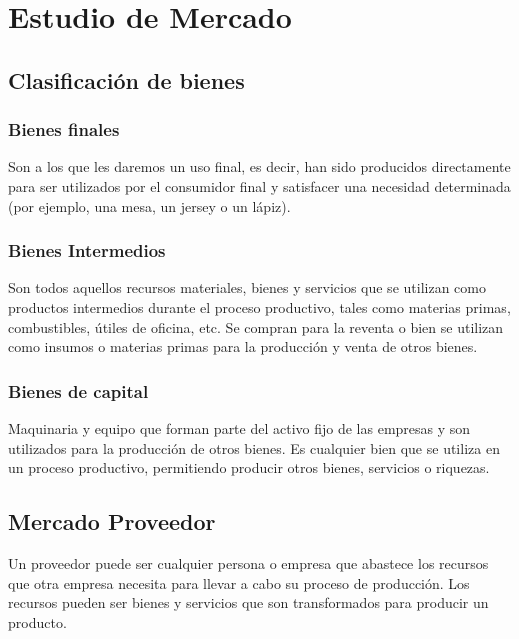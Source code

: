 \documentclass[../main]{subfiles}
\begin{document}
\chapter{Estudio de Mercado}
\section{Clasificación de bienes}
\subsection{Bienes finales}
Son a los que les daremos un uso final, es decir, han sido producidos
directamente para ser utilizados por el consumidor final y satisfacer
una necesidad determinada (por ejemplo, una mesa, un jersey o un lápiz).
\subsection{Bienes Intermedios}
Son todos aquellos recursos materiales, bienes y servicios que se
utilizan como productos intermedios durante el proceso productivo,
tales como materias primas, combustibles, útiles de oficina, etc. Se
compran para la reventa o bien se utilizan como insumos o materias
primas para la producción y venta de otros bienes.
\subsection{Bienes de capital}
Maquinaria y equipo que forman parte del activo fijo de las empresas
y son utilizados para la producción de otros bienes. Es cualquier
bien que se utiliza en un proceso productivo, permitiendo producir
otros bienes, servicios o riquezas.
\section{Mercado Proveedor}
Un proveedor puede ser cualquier persona o empresa que abastece los
recursos que otra empresa necesita para llevar a cabo su proceso de
producción. Los recursos pueden ser bienes y servicios que son
transformados para producir un producto.
\end{document}
